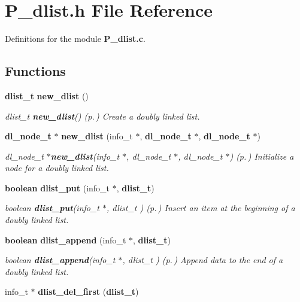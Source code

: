 \section{P\_\-dlist.h File Reference}
\label{P__dlist_8h}
Definitions for the module {\bf P\_\-dlist.c}. 


\subsection*{Functions}
\begin{CompactItemize}
\item 
{\bf dlist\_\-t} {\bf new\_\-dlist} ()
\begin{CompactList}\small\item\em dlist\_\-t {\bf new\_\-dlist}() {\rm (p.\,\pageref{P__dlist_8h_a0})} Create a doubly linked list.\item\end{CompactList}\item 
{\bf dl\_\-node\_\-t} $\ast$ {\bf new\_\-dlist} (info\_\-t $\ast$, {\bf dl\_\-node\_\-t} $\ast$, {\bf dl\_\-node\_\-t} $\ast$)
\begin{CompactList}\small\item\em dl\_\-node\_\-t $\ast${\bf new\_\-dlist}(info\_\-t $\ast$, dl\_\-node\_\-t $\ast$, dl\_\-node\_\-t $\ast$) {\rm (p.\,\pageref{P__dlist_8h_a1})} Initialize a node for a doubly linked list.\item\end{CompactList}\item 
{\bf boolean} {\bf dlist\_\-put} (info\_\-t $\ast$, {\bf dlist\_\-t})
\begin{CompactList}\small\item\em boolean {\bf dlist\_\-put}(info\_\-t $\ast$, dlist\_\-t ) {\rm (p.\,\pageref{P__dlist_8h_a2})} Insert an item at the beginning of a doubly linked list.\item\end{CompactList}\item 
{\bf boolean} {\bf dlist\_\-append} (info\_\-t $\ast$, {\bf dlist\_\-t})
\begin{CompactList}\small\item\em boolean {\bf dlist\_\-append}(info\_\-t $\ast$, dlist\_\-t ) {\rm (p.\,\pageref{P__dlist_8h_a3})} Append data to the end of a doubly linked list.\item\end{CompactList}\item 
info\_\-t $\ast$ {\bf dlist\_\-del\_\-first} ({\bf dlist\_\-t})

\end{CompactItemize}
